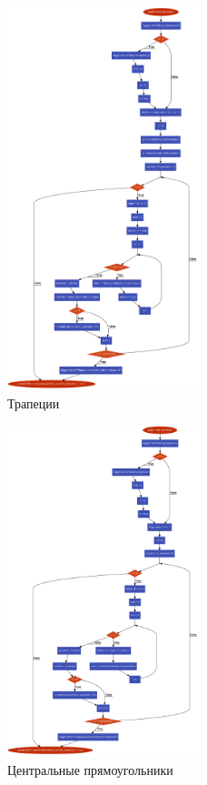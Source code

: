 \documentclass{article}
\begin{document}
\begin{figure}[H]
    \centering
    \includegraphics[width=0.5\textwidth]{trapez.pdf}
    \caption{Трапеции}
    \label{fig:logs}
\end{figure}

\begin{figure}[H]
    \centering
    \includegraphics[width=0.5\textwidth]{center.pdf}
    \caption{Центральные прямоугольники}
    \label{fig:logs}
\end{figure}
\end{document}
